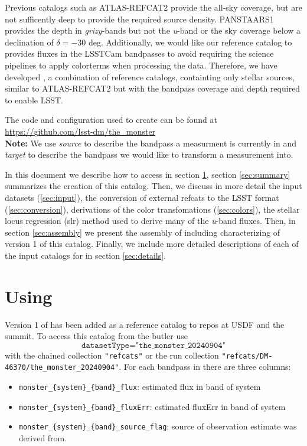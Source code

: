 Previous catalogs such as ATLAS-REFCAT2 \citep{Tonry:2018} provide the all-sky coverage, but are not sufficently deep to provide the required source density. 
PANSTAARS1\citep[PS1;][]{Chambers:2016} provides the depth in \emph{grizy}-bands but not the \emph{u}-band or the sky coverage below a declination of $\delta = -30$ deg. 
Additionally, we would like our reference catalog to provides fluxes in the LSSTCam bandpasses to avoid requiring the science pipelines to apply colorterms when processing the data.
Therefore, we have developed \monster, a combination of reference catalogs, containting only stellar sources, similar to ATLAS-REFCAT2 but with the bandpass coverage and depth required to enable LSST. 

The code and configuration used to create \monster can be found at \url{https://github.com/lsst-dm/the_monster}\\

\textbf{Note:} We use \emph{source} to describe the bandpass a measurment is currently in and \emph{target} to describe the bandpass we would like to transform a measurement into. 

In this document we describe how to access \monster in section \ref{sec:using}, section \ref{sec:summary} summarizes the creation of this catalog. Then, we discuss in more detail the input datasets (\ref{sec:input}), the 
conversion of external refcats to the LSST format (\ref{sec:conversion}), derivations of the color transfomations (\ref{sec:colors}), the stellar locus regression (slr) method used to derive many of the \emph{u}-band fluxes. 
Then, in section \ref{sec:assembly} we present the assembly of \monster including characterizing of version 1 of this catalog. 
Finally, we include more detailed descriptions of each of the input catalogs for \monster in section \ref{sec:details}. 

\section{Using \monster}
\label{sec:using}
Version 1 of \monster  has been added as a reference catalog to repos at USDF and the summit. 
To access this catalog from the butler use
$$\texttt{datasetType="the\_monster\_20240904"}$$ 
with the chained collection \texttt{"refcats"} or the run collection \texttt{"refcats/DM-46370/the\_monster\_20240904"}. 
For each bandpass in \monster there are three columns: 
\begin{itemize}
    \item \texttt{monster\_\{system\}\_\{band\}\_flux}: estimated flux in band of system 
    \item \texttt{monster\_\{system\}\_\{band\}\_fluxErr}: estimated fluxErr in band of system 
    \item \texttt{monster\_\{system\}\_\{band\}\_source\_flag}: source of observation estimate was derived from.  
\end{itemize}

